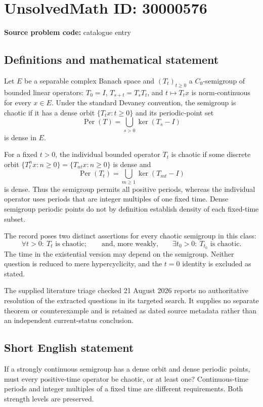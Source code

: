 \documentclass[11pt]{article}
\begin{document}
\section*{UnsolvedMath ID: 30000576}
\textbf{Source problem code:} catalogue entry
\subsection{Definitions and mathematical statement}
Let $E$ be a separable complex Banach space and $(T_t)_{t\geq0}$ a $C_0$-semigroup of bounded linear operators: $T_0=I$, $T_{s+t}=T_sT_t$, and $t\mapsto T_tx$ is norm-continuous for every $x\in E$. Under the standard Devaney convention, the semigroup is chaotic if it has a dense orbit $\{T_tx:t\geq0\}$ and its periodic-point set
\[
 \operatorname{Per}(T)=\bigcup_{s>0}\ker(T_s-I)
\]
is dense in $E$.

For a fixed $t>0$, the individual bounded operator $T_t$ is chaotic if some discrete orbit $\{T_t^nx:n\geq0\}=\{T_{nt}x:n\geq0\}$ is dense and
\[
 \operatorname{Per}(T_t)=\bigcup_{m\geq1}\ker(T_{mt}-I)
\]
is dense. Thus the semigroup permits all positive periods, whereas the individual operator uses periods that are integer multiples of one fixed time. Dense semigroup periodic points do not by definition establish density of each fixed-time subset.

The record poses two distinct assertions for every chaotic semigroup in this class:
\[
 \forall t>0:\ T_t\text{ is chaotic};
 \qquad\text{and, more weakly,}\qquad
 \exists t_0>0:\ T_{t_0}\text{ is chaotic}.
\]
The time in the existential version may depend on the semigroup. Neither question is reduced to mere hypercyclicity, and the $t=0$ identity is excluded as stated.

The supplied literature triage checked 21 August 2026 reports no authoritative resolution of the extracted questions in its targeted search. It supplies no separate theorem or counterexample and is retained as dated source metadata rather than an independent current-status conclusion.
\subsection{Short English statement}
If a strongly continuous semigroup has a dense orbit and dense periodic points, must every positive-time operator be chaotic, or at least one? Continuous-time periods and integer multiples of a fixed time are different requirements. Both strength levels are preserved.
\end{document}
